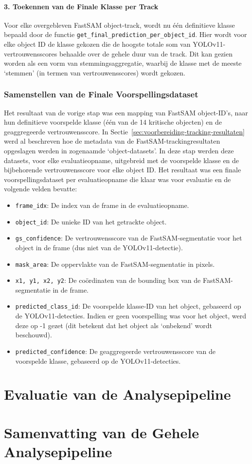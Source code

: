 \paragraph{3. Toekennen van de Finale Klasse per Track}
Voor elke overgebleven FastSAM object-track, wordt nu één definitieve klasse bepaald door de functie \texttt{get\_final\_prediction\_per\_object\_id}. 
Hier wordt voor elke object ID de klasse gekozen die de hoogste totale som van YOLOv11-vertrouwensscores 
behaalde over de gehele duur van de track. 
Dit kan gezien worden als een vorm van stemmingsaggregatie, 
waarbij de klasse met de meeste `stemmen' (in termen van vertrouwensscores) wordt gekozen.

\subsubsection{Samenstellen van de Finale Voorspellingsdataset}
Het resultaat van de vorige stap was een mapping van FastSAM object-ID's, 
naar hun definitieve voorspelde klasse (één van de 14 kritische objecten) 
en de geaggregeerde vertrouwensscore.
In Sectie~\ref{sec:voorbereiding-tracking-resultaten} werd al beschreven hoe de metadata van de FastSAM-trackingresultaten opgeslagen werden in zogenaamde `object-datasets'.
In deze stap werden deze datasets, voor elke evaluatieopname, uitgebreid met de voorspelde klasse en de bijbehorende vertrouwensscore voor elke object ID.
Het resultaat was een finale voorspellingsdataset per evaluatieopname die klaar was voor evaluatie en de volgende velden bevatte:
\begin{itemize}
    \item \texttt{frame\_idx}: De index van de frame in de evaluatieopname.
    \item \texttt{object\_id}: De unieke ID van het getrackte object.
    \item \texttt{gs\_confidence}: De vertrouwensscore van de FastSAM-segmentatie voor het object in de frame (dus niet van de YOLOv11-detectie).
    \item \texttt{mask\_area}: De oppervlakte van de FastSAM-segmentatie in pixels.
    \item \texttt{x1, y1, x2, y2}: De coördinaten van de bounding box van de FastSAM-segmentatie in de frame.
    \item \texttt{predicted\_class\_id}: De voorspelde klasse-ID van het object, gebaseerd op de YOLOv11-detecties.
    Indien er geen voorspelling was voor het object, werd deze op -1 gezet (dit betekent dat het object als `onbekend' wordt beschouwd).
    \item \texttt{predicted\_confidence}: De geaggregeerde vertrouwensscore van de voorspelde klasse, gebaseerd op de YOLOv11-detecties.
\end{itemize}

\section{Evaluatie van de Analysepipeline}

\section{Samenvatting van de Gehele Analysepipeline}